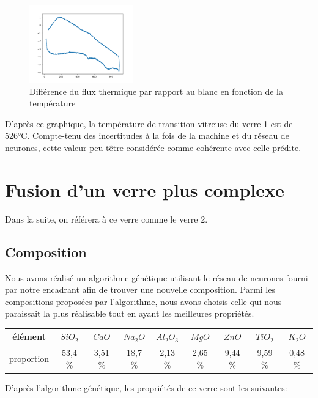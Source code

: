 \documentclass{article}
\begin{document}
\begin{figure}[ht]
    \centering
    \includegraphics[width=0.4\textwidth]{photos/Figure 1.png}
    \caption{Différence du flux thermique par rapport au blanc en fonction de la température}
\end{figure}

D'après ce graphique, la température de transition vitreuse du verre 1 est de 526°C. Compte-tenu des incertitudes à la fois de la machine et du réseau de neurones, cette valeur peu têtre considérée comme cohérente avec celle prédite.

\section{Fusion d'un verre plus complexe}
Dans la suite, on référera à ce verre comme le verre 2.

\subsection{Composition}

Nous avons réalisé un algorithme génétique utilisant le réseau de neurones fourni par notre encadrant afin de trouver une nouvelle composition. 
Parmi les compositions proposées par l'algorithme, nous avons choisis celle qui nous paraissait la plus réalisable tout en ayant les meilleures propriétés.

\begin{table}[ht]
    \centering
    \begin{tabular}{|c|c|c|c|c|c|c|c|c|}
        \hline
        élément &  $SiO_2$ & $CaO$ & $Na_2O$ & $Al_2O_3$ & $MgO$ & $ZnO$ & $TiO_2$ & $K_2O$ \\
        \hline
        proportion & 53,4 \% & 3,51 \% & 18,7 \% & 2,13 \% & 2,65 \% & 9,44 \% & 9,59 \% & 0,48 \%\\
        \hline
        \end{tabular} 
    \end{table}
D'après l'algorithme génétique, les propriétés de ce verre sont les suivantes:
\end{document}
